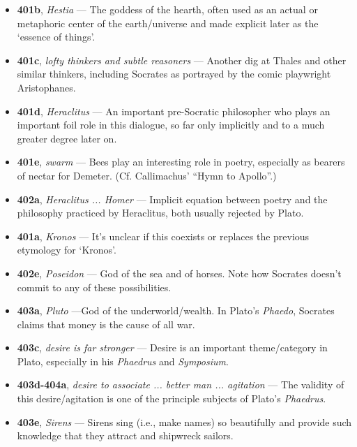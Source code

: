 \documentclass[12pt]{article}
\begin{document}
\begin{itemize}
\item \textbf{401b}, \textit{Hestia} --- The goddess of the hearth, often used as an actual or metaphoric center of the earth/universe and made explicit later as the `essence of things'.

\item \textbf{401c}, \textit{lofty thinkers and subtle reasoners} --- Another dig at Thales and other similar thinkers, including Socrates as portrayed by the comic playwright Aristophanes.

\item \textbf{401d}, \textit{Heraclitus} --- An important pre-Socratic philosopher who plays an important foil role in this dialogue, so far only implicitly and to a much greater degree later on.

\item \textbf{401e}, \textit{swarm} --- Bees play an interesting role in poetry, especially as bearers of nectar for Demeter. (Cf. Callimachus' ``Hymn to Apollo''.)

\item \textbf{402a}, \textit{Heraclitus ... Homer} --- Implicit equation between poetry and the philosophy practiced by Heraclitus, both usually rejected by Plato.

\item \textbf{401a}, \textit{Kronos} --- It's unclear if this coexists or replaces the previous etymology for `Kronos'.

\item \textbf{402e}, \textit{Poseidon} --- God of the sea and of horses. Note how Socrates doesn't commit to any of these possibilities.

\item \textbf{403a}, \textit{Pluto} ---God of the underworld/wealth. In Plato's \textit{Phaedo}, Socrates claims that money is the cause of all war.

\item \textbf{403c}, \textit{desire is far stronger} --- Desire is an important theme/category in Plato, especially in his \textit{Phaedrus} and \textit{Symposium}.

\item \textbf{403d-404a}, \textit{desire to associate ... better man ... agitation} --- The validity of this desire/agitation is one of the principle subjects of Plato's \textit{Phaedrus}.

\item \textbf{403e}, \textit{Sirens} --- Sirens sing (i.e., make names) so beautifully and provide such knowledge that they attract and shipwreck sailors.


\end{itemize}
\end{document}
